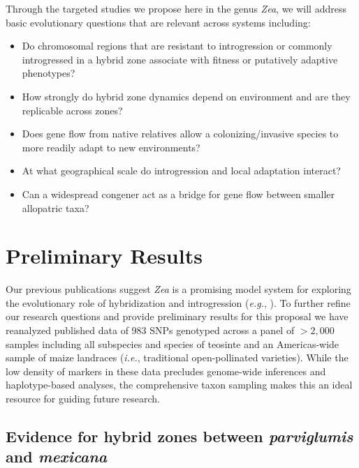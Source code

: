 Through the targeted studies we propose here in the genus \emph{Zea}, we will address basic evolutionary questions that are relevant across systems including:
\begin{itemize}\itemsep0pt
\item Do chromosomal regions that are resistant to introgression or commonly introgressed in a hybrid zone associate with fitness or putatively adaptive phenotypes?
\item How strongly do hybrid zone dynamics depend on environment and are they replicable across zones?
\item Does gene flow from native relatives allow a colonizing/invasive species to more readily adapt to new environments?
\item At what geographical scale do introgression and local adaptation interact?
\item Can a widespread congener act as a bridge for gene flow between smaller allopatric taxa?
\end{itemize}

\section*{Preliminary Results}

Our previous publications suggest \emph{Zea} is a promising model system for exploring the evolutionary role of hybridization and introgression (\emph{e.g.},  \citealt{Ross-Ibarra2009a, vanheerwaarden2011a, Hufford2013, Pyhajarvi2013}).  To further refine our research questions and provide preliminary results for this proposal we have reanalyzed published data  \citep{Fang2012} of 983 SNPs genotyped across a panel of $>2,000$ samples including all subspecies and species of teosinte and an Americas-wide sample of maize landraces (\emph{i.e.}, traditional open-pollinated varieties).  While the low density of markers in these data precludes genome-wide inferences and haplotype-based analyses, the comprehensive taxon sampling makes this an ideal resource for guiding future research.

\subsection*{Evidence for hybrid zones between \emph{parviglumis} and \emph{mexicana}}

